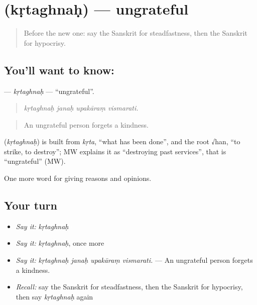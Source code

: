 \section[\texorpdfstring{\sk{कृतघ्नः} (kṛtaghnaḥ)}{कृतघ्नः (kṛtaghnaḥ)}]{ (kṛtaghnaḥ) — ungrateful}

\label{lesson:SA-C361-krtaghnah}



\begin{quote}
Before the new one: say the Sanskrit for steadfastness, then the Sanskrit for hypocrisy.
\end{quote}

\subsection*{You'll want to know: }
\textbf{} — \emph{kṛtaghnaḥ} — \textquotedblleft{}ungrateful\textquotedblright{}.

\begin{quote}
   
\end{quote}

\begin{quote}
\emph{kṛtaghnaḥ janaḥ upakāraṃ vismarati.}
\end{quote}

\begin{quote}
An ungrateful person forgets a kindness.
\end{quote}

\begin{cousinweb}
\textbf{} (\emph{kṛtaghnaḥ}) is built from \emph{kṛta}, \textquotedblleft{}what has been done\textquotedblright{}, and the root √han, \textquotedblleft{}to strike, to destroy\textquotedblright{}; MW explains it as \textquotedblleft{}destroying past services\textquotedblright{}, that is \textquotedblleft{}ungrateful\textquotedblright{} (MW).
\end{cousinweb}

\begin{grammarlens}[title={What you've built}]
One more word for giving reasons and opinions.
\end{grammarlens}

\subsection*{Your turn}
\begin{itemize}
\raggedright
  \item \emph{Say it:} \emph{kṛtaghnaḥ}
  \item \emph{Say it:} \emph{kṛtaghnaḥ}, once more
  \item \emph{Say it:} \emph{kṛtaghnaḥ janaḥ upakāraṃ vismarati.} — An ungrateful person forgets a kindness.
  \item \emph{Recall:} say the Sanskrit for steadfastness, then the Sanskrit for hypocrisy, then say \emph{kṛtaghnaḥ} again
\end{itemize}

